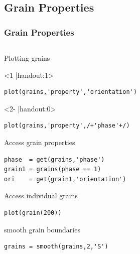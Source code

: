 \subsection*{Grain Properties}


\begin{frame}[fragile]
  \frametitle{Grain Properties}

  \begin{columns}
    \begin{column}{8.5cm}

      Plotting grains
      \begin{onlyenv}<1 |handout:1>
\begin{lstlisting}
plot(grains,'property','orientation')
\end{lstlisting}
      \end{onlyenv}

      \begin{onlyenv}<2- |handout:0>
\begin{lstlisting}
plot(grains,'property',/+'phase'+/)
\end{lstlisting}
      \end{onlyenv}

      \pause
      \pause

\bigskip

      Access grain properties
\begin{lstlisting}
phase  = get(grains,'phase')
grain1 = grains(phase == 1)
ori    = get(grain1,'orientation')
\end{lstlisting}

\pause

\bigskip

Access individual grains
\begin{lstlisting}
plot(grain(200))
\end{lstlisting}

\pause
\bigskip

smooth grain boundaries
\begin{lstlisting}
grains = smooth(grains,2,'S')
\end{lstlisting}





\end{column}
\end{columns}
\end{frame}
